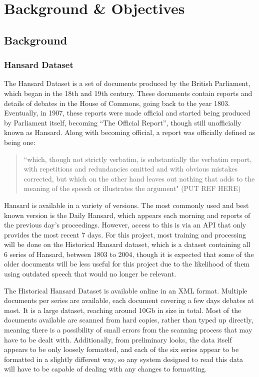 \chapter{Background \& Objectives}

\section{Background}

\subsection{Hansard Dataset}

The Hansard Dataset is a set of documents produced by the British Parliament, which began in the 18th and 19th century. These documents contain reports and details of debates in the House of Commons, going back to the year 1803. Eventually, in 1907, these reports were made official and started being produced by Parliament itself, becoming “The Official Report”, though still unofficially known as Hansard. Along with becoming official, a report was officially defined as being one:
\begin{quote} “which, though not strictly verbatim, is substantially the verbatim report, with repetitions and redundancies omitted and with obvious mistakes corrected, but which on the other hand leaves out nothing that adds to the meaning of the speech or illustrates the argument" (PUT REF HERE)
\end{quote}
Hansard is available in a variety of versions. The most commonly used and best known version is the Daily Hansard, which appears each morning and reports of the previous day’s proceedings. However, access to this is via an API that only provides the most recent 7 days. For this project, most training and processing will be done on the Historical Hansard dataset, which is a dataset containing all 6 series of Hansard, between 1803 to 2004, though it is expected that some of the older documents will be less useful for this project due to the likelihood of them using outdated speech that would no longer be relevant.

The Historical Hansard Dataset is available online in an XML format. Multiple documents per series are available, each document covering a few days debates at most. It is a large dataset, reaching around 10Gb in size in total. Most of the documents available are scanned from hard copies, rather than typed up directly, meaning there is a possibility of small errors from the scanning process that may have to be dealt with. Additionally, from preliminary looks, the data itself appears to be only loosely formatted, and each of the six series appear to be formatted in a slightly different way, so any system designed to read this data will have to be capable of dealing with any changes to formatting.

